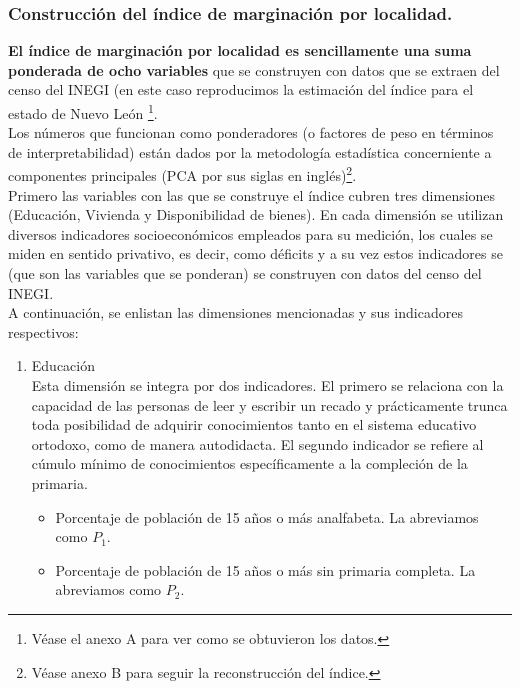 \documentclass[paper=letter, fontsize=11pt]{scrartcl}
\numberwithin{equation}{section} %
\numberwithin{figure}{section} %
\numberwithin{table}{section} %
\begin{document}
\begin{enumerate}
 \subsubsection{Construcción del índice de marginación por localidad.}
 \textbf{El índice de marginación por localidad es sencillamente una suma ponderada de ocho variables} que se construyen con datos que se extraen del censo del INEGI (en este caso reproducimos la estimación del índice para el estado de Nuevo León \footnote{Véase el anexo A para ver como se obtuvieron los datos.}. \\
Los números que funcionan como ponderadores (o factores de peso en términos de interpretabilidad) están dados por la metodología estadística concerniente a componentes principales (PCA por sus siglas en inglés)\footnote{Véase anexo B para seguir la reconstrucción del índice.}.\\
Primero las variables con las que se construye el índice cubren tres dimensiones (Educación, Vivienda y Disponibilidad de bienes). En cada dimensión se utilizan diversos 
indicadores socioeconómicos empleados para su medición, los cuales se miden en sentido privativo, es decir, como déficits y a su vez estos indicadores se (que son las variables que se ponderan) se construyen con datos del censo del INEGI.\\
A continuación, se enlistan las dimensiones mencionadas y sus indicadores respectivos:
\begin{enumerate}
\item Educación \\ 
Esta dimensión se integra por dos indicadores. El primero se relaciona con la capacidad
de las personas de leer y escribir un recado y prácticamente trunca toda posibilidad de adquirir conocimientos tanto en el sistema educativo ortodoxo, como de manera autodidacta. El segundo indicador se refiere al cúmulo mínimo de conocimientos específicamente a la compleción de la primaria. 
\begin{itemize}
\item Porcentaje de población de 15 años o más analfabeta. La abreviamos como $P_1$.
\item Porcentaje de población de 15 años o más sin primaria completa. La abreviamos como $P_2$.
\end{itemize}


\end{enumerate}
\end{enumerate}
\end{document}
